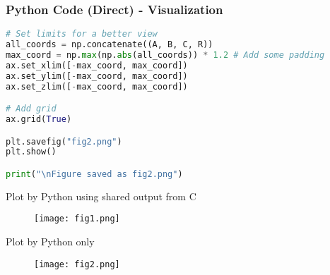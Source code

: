 \documentclass{beamer}
\begin{document}
\begin{frame}[fragile]
\frametitle{Python Code (Direct) - Visualization}
\begin{lstlisting}[language=Python]
# Set limits for a better view
all_coords = np.concatenate((A, B, C, R))
max_coord = np.max(np.abs(all_coords)) * 1.2 # Add some padding
ax.set_xlim([-max_coord, max_coord])
ax.set_ylim([-max_coord, max_coord])
ax.set_zlim([-max_coord, max_coord])

# Add grid
ax.grid(True)

plt.savefig("fig2.png")
plt.show()

print("\nFigure saved as fig2.png")
\end{lstlisting}
\end{frame}

\begin{frame}{Plot by Python using shared output from C}
\begin{figure}[H]
        \centering
        \texttt{[image: fig1.png]}
        \caption{}
        \label{fig:1}
    \end{figure}
\end{frame}

 \begin{frame}{Plot by Python only}
\begin{figure}[H]
        \centering
        \texttt{[image: fig2.png]}
        \caption{}
        \label{fig:2}
    \end{figure}
\end{frame}
\end{document}
